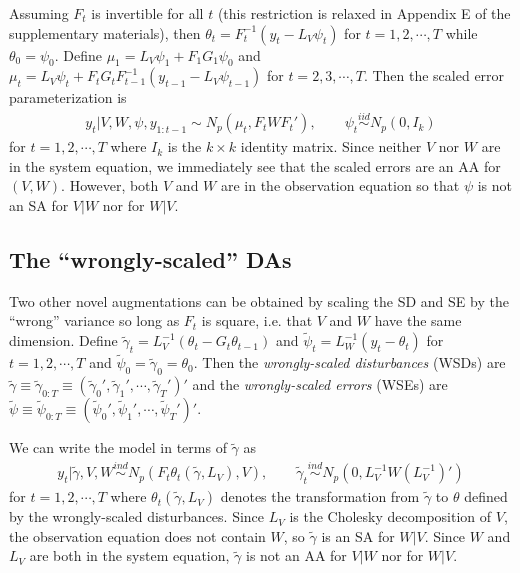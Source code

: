 \documentclass[12pt]{article}
\begin{document}
Assuming $F_t$ is invertible for all $t$ (this restriction is relaxed in Appendix E of the supplementary materials), then $\theta_t = F_t^{-1}(y_t - L_V\psi_t)$ for $t=1,2,\cdots,T$ while $\theta_0=\psi_0$. Define $\mu_1 = L_V\psi_1 + F_1G_1\psi_0$ and $\mu_t =L_V\psi_t + F_tG_tF_{t-1}^{-1}(y_{t-1} - L_{V}\psi_{t-1})$ for $t=2,3,\cdots,T$. Then the scaled error parameterization is 
\begin{align*}
  y_t|V,W,\psi,y_{1:t-1} \sim N_p(\mu_t, F_tWF_t'), \qquad \psi_t  \stackrel{iid}{\sim} N_p(0,I_k)
\end{align*}
for $t=1,2,\cdots,T$ where $I_k$ is the $k\times k$ identity matrix. Since neither $V$ nor $W$ are in the system equation, we immediately see that the scaled errors are an AA for $(V,W)$. However, both $V$ and $W$ are in the observation equation so that $\psi$ is not an SA for $V|W$ nor for $W|V$.

\subsection{The ``wrongly-scaled'' DAs}
Two other novel augmentations can be obtained by scaling the SD and SE by the ``wrong'' variance so long as $F_t$ is square, i.e. that $V$ and $W$ have the same dimension. Define $\tilde{\gamma}_t=L_V^{-1}(\theta_t - G_t\theta_{t-1})$ and $\tilde{\psi}_t=L_W^{-1}(y_t - \theta_t)$ for $t=1,2,\cdots,T$ and $\tilde{\psi}_0=\tilde{\gamma}_0=\theta_0$. Then the {\it wrongly-scaled disturbances} (WSDs) are $\tilde{\gamma}\equiv\tilde{\gamma}_{0:T}\equiv(\tilde{\gamma}_0',\tilde{\gamma}_1',\cdots,\tilde{\gamma}_T')'$ and the {\it wrongly-scaled errors} (WSEs) are $\tilde{\psi}\equiv\tilde{\psi}_{0:T}\equiv(\tilde{\psi}_0',\tilde{\psi}_1',\cdots,\tilde{\psi}_T')'$.

We can write the model in terms of $\tilde{\gamma}$ as
\begin{align*}
  y_t|\tilde{\gamma},V,W \stackrel{ind}{\sim} N_p\left(F_t\theta_t(\tilde{\gamma},L_V), V\right), \qquad  
  \tilde{\gamma}_t \stackrel{ind}{\sim}N_p(0,L_V^{-1}W(L_V^{-1})')
\end{align*}
for $t=1,2,\cdots,T$ where $\theta_t(\tilde{\gamma},L_V)$ denotes the transformation from $\tilde{\gamma}$ to $\theta$ defined by the wrongly-scaled disturbances. Since $L_V$ is the Cholesky decomposition of $V$, the observation equation does not contain $W$, so $\tilde{\gamma}$ is an SA for $W|V$. Since $W$ and $L_V$ are both in the system equation, $\tilde{\gamma}$ is not an AA for $V|W$ nor for $W|V$. 
\end{document}
